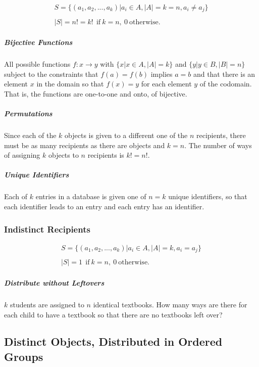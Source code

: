 \begin{equation}	
\begin{array}{l}
S = \{ (a_1,a_2,...,a_k) | a_i \in A, |A| = k = n, a_i\neq a_j\}\\
\\
|S| = n! = k!\ \ \mathrm{if\ }k=n,\ 0\ \mathrm{otherwise.}
\end{array}
\end{equation}

\subparagraph{Bijective Functions} All possible functions $f:x \rightarrow y$ with $\{x | x\in A, |A| = k \}$ and $\{y | y\in B, |B| = n\}$ subject to the constraints that $f(a) = f(b)$ implies $a=b$ and that there is an element $x$ in the domain so that $f(x)=y$ for each element $y$ of the codomain. That is, the functions are one-to-one and onto, of bijective.

\subparagraph{Permutations} Since each of the $k$ objects is given to a different one of the $n$ recipients, there must be as many recipients as there are objects and $k=n$. The number of ways of assigning $k$ objects to $n$ recipients is $k!=n!$.

\subparagraph{Unique Identifiers} Each of $k$ entries in a database is given one of $n=k$ unique identifiers, so that each identifier leads to an entry and each entry has an identifier. 

\subsubsection{Indistinct Recipients}

\begin{equation}	
\begin{array}{l}
S = \{ (a_1,a_2,...,a_k) | a_i \in A, |A| = k, a_i=a_j\}\\
\\
|S| = 1\ \ \mathrm{if\ }k = n,\ 0\ \mathrm{otherwise.}
\end{array}
\end{equation}



\subparagraph{Distribute without Leftovers} $k$ students are assigned to $n$ identical textbooks. How many ways are there for each child to have a textbook so that there are no textbooks left over? 
 


\subsection{Distinct Objects, Distributed in Ordered Groups}

